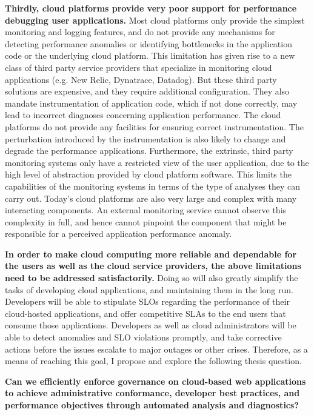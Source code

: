 \textbf{Thirdly, cloud platforms provide very poor support for performance debugging
user applications.} Most cloud platforms only provide the simplest monitoring and logging features,
and do not provide any mechanisms for detecting performance anomalies or identifying
bottlenecks in the application code or the underlying cloud platform. This limitation has given rise
to a new class of third party service providers that specialize in monitoring cloud applications
(e.g. New Relic, Dynatrace, Datadog). But these third party solutions are expensive, and they 
require additional configuration. 
They also mandate instrumentation of application code, which if not done
correctly, may lead to incorrect diagnoses concerning application performance. The cloud
platforms do not provide any facilities for ensuring correct instrumentation. The perturbation
introduced by the instrumentation is also likely to change and degrade the performance
applications.
Furthermore, the extrinsic, third party monitoring systems only have a restricted view 
of the user application, due to the high level of abstraction provided by cloud platform software.
This limits the capabilities of the monitoring systems in terms of the type of analyses they can carry out.
Today's cloud platforms are also very large and complex with many interacting components.
An external monitoring service cannot observe this complexity in full, and hence cannot pinpoint
the component that might be responsible for a perceived application performance anomaly.

\textbf{In order to make cloud computing more reliable and dependable for the users as well
as the cloud service providers, the above limitations need to be addressed satisfactorily.}
Doing so will also greatly simplify the tasks of developing cloud applications, and maintaining 
them in the long run. Developers will be able to stipulate SLOs regarding the performance of
their cloud-hosted applications, and offer competitive SLAs to the end users that consume those
applications. Developers as well as cloud administrators will be able to detect anomalies and
SLO violations promptly, and take corrective actions before the issues escalate to major
outages or other crises. Therefore, as a means of reaching this goal, I propose and explore the
following thesis question.

{\bf Can we efficiently enforce governance on cloud-based web applications to achieve 
administrative conformance, developer best practices, and performance objectives through 
automated analysis and diagnostics?} 

